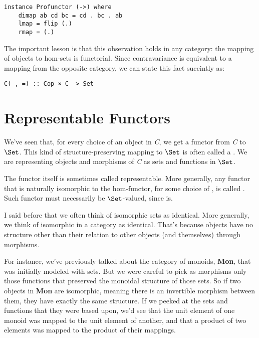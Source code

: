 \begin{Verbatim}[commandchars=\\\{\}]
instance Profunctor (->) where
    dimap ab cd bc = cd . bc . ab
    lmap = flip (.)
    rmap = (.)
\end{Verbatim}
The important lesson is that this observation holds in any category: the
mapping of objects to hom-sets is functorial. Since contravariance is
equivalent to a mapping from the opposite category, we can state this
fact succintly as:

\begin{Verbatim}[commandchars=\\\{\}]
C(-, =) :: Cop × C -> Set
\end{Verbatim}

\section{Representable Functors}\label{representable-functors}

We've seen that, for every choice of an object  in \emph{C},
we get a functor from \emph{C} to $\Set$. This kind of
structure-preserving mapping to $\Set$ is often called a
. We are representing objects and morphisms of
\emph{C} as sets and functions in $\Set$.

The functor  itself is sometimes called representable.
More generally, any functor  that is naturally isomorphic to
the hom-functor, for some choice of , is called
. Such functor must necessarily be
$\Set$-valued, since  is.

I said before that we often think of isomorphic sets as identical. More
generally, we think of isomorphic  in a category as
identical. That's because objects have no structure other than their
relation to other objects (and themselves) through morphisms.

For instance, we've previously talked about the category of monoids,
\textbf{Mon}, that was initially modeled with sets. But we were careful
to pick as morphisms only those functions that preserved the monoidal
structure of those sets. So if two objects in \textbf{Mon} are
isomorphic, meaning there is an invertible morphism between them, they
have exactly the same structure. If we peeked at the sets and functions
that they were based upon, we'd see that the unit element of one monoid
was mapped to the unit element of another, and that a product of two
elements was mapped to the product of their mappings.

